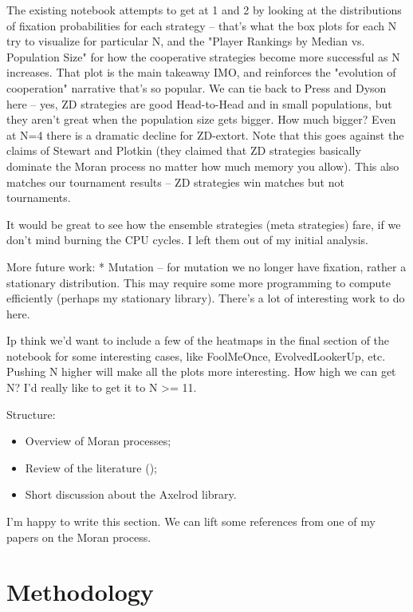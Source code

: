 \documentclass{article}
\begin{document}
{The existing notebook attempts to get at 1 and 2 by looking at the distributions
of fixation probabilities for each strategy -- that's what the box plots for
each N try to visualize for particular N, and the "Player Rankings by Median vs.
Population Size" for how the cooperative strategies become more successful as N
increases. That plot is the main takeaway IMO, and reinforces the "evolution of
cooperation" narrative that's so popular. We can tie back to Press and Dyson
here -- yes, ZD strategies are good Head-to-Head and in small populations, but
they aren't great when the population size gets bigger. How much bigger? Even at
N=4 there is a dramatic decline for ZD-extort. Note that this goes against the
claims of Stewart and Plotkin (they claimed that ZD strategies basically
dominate the Moran process no matter how much memory you allow). This also
matches our tournament results -- ZD strategies win matches but not tournaments.

It would be great to see how the ensemble strategies (meta strategies) fare, if
we don't mind burning the CPU cycles. I left them out of my initial analysis.

More future work: * Mutation -- for mutation we no longer have fixation, rather
a stationary distribution. This may require some more programming to compute
efficiently (perhaps my stationary library). There's a lot of interesting work
to do here.

Ip think we'd want to include a few of the heatmaps in the final section of the
notebook for some interesting cases, like FoolMeOnce, EvolvedLookerUp, etc.
Pushing N higher will make all the plots more interesting. How high we can get
N? I'd really like to get it to N >= 11.

Structure:

\begin{itemize}
    \item Overview of Moran processes;
    \item Review of the literature (\cite{Lee2015, Nowak, Moran1957});
    \item Short discussion about the Axelrod library.
\end{itemize}

I'm happy to write this section. We can lift some references from one of my
papers on the Moran process.

\section{Methodology}\label{sec:methodology}

}
\end{document}

